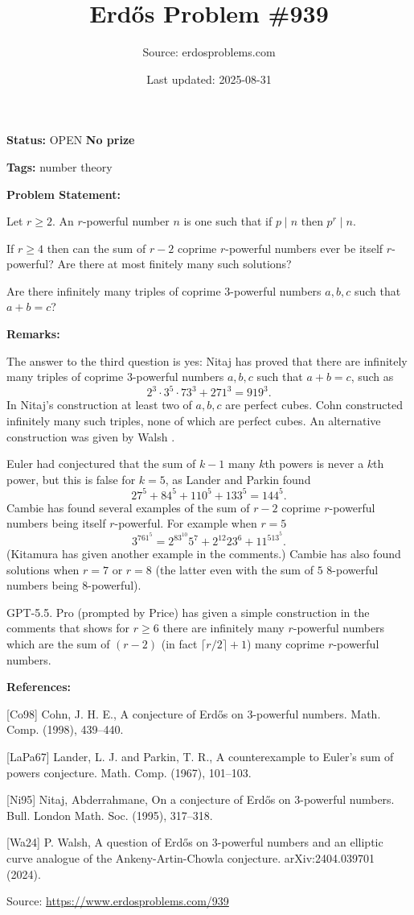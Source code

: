 \documentclass{article}
\title{Erd\H{o}s Problem \#939}
\date{Last updated: 2025-08-31}
\author{Source: erdosproblems.com}
\begin{document}
\maketitle

\noindent\textbf{Status:} OPEN \quad \textbf{No prize}

\noindent\textbf{Tags:} number theory

\medskip
\noindent\textbf{Problem Statement:}

Let $r\geq 2$. An $r$-powerful number $n$ is one such that if $p\mid n$ then $p^r\mid n$.

If $r\geq 4$ then can the sum of $r-2$ coprime $r$-powerful numbers ever be itself $r$-powerful? Are there at most finitely many such solutions?

Are there infinitely many triples of coprime $3$-powerful numbers $a,b,c$ such that $a+b=c$?

\bigskip
\noindent\textbf{Remarks:}

The answer to the third question is yes: Nitaj \cite{Ni95} has proved that there are infinitely many triples of coprime $3$-powerful numbers $a,b,c$ such that $a+b=c$, such as\[2^3\cdot 3^5\cdot 73^3+271^3 = 919^3.\]In Nitaj's construction at least two of $a,b,c$ are perfect cubes. Cohn \cite{Co98} constructed infinitely many such triples, none of which are perfect cubes. An alternative construction was given by Walsh \cite{Wa24}.

Euler had conjectured that the sum of $k-1$ many $k$th powers is never a $k$th power, but this is false for $k=5$, as Lander and Parkin \cite{LaPa67} found\[27^5+84^5+110^5+133^5=144^5.\]Cambie has found several examples of the sum of $r-2$ coprime $r$-powerful numbers being itself $r$-powerful. For example when $r=5$\[3^761^5=2^83^{10}5^7+2^{12}23^6+11^513^5.\](Kitamura has given another example in the comments.) Cambie has also found solutions when $r=7$ or $r=8$ (the latter even with the sum of $5$ $8$-powerful numbers being $8$-powerful).

GPT-5.5. Pro (prompted by Price) has given a simple construction in the comments that shows for $r\geq 6$ there are infinitely many $r$-powerful numbers which are the sum of $(r-2)$ (in fact $\lceil r/2\rceil+1$) many coprime $r$-powerful numbers.

\bigskip
\noindent\textbf{References:}

[Co98] Cohn, J. H. E., A conjecture of {E}rd\H{o}s on {$3$}-powerful numbers. Math. Comp. (1998), 439--440.
 
 [LaPa67] Lander, L. J. and Parkin, T. R., A counterexample to {E}uler's sum of powers conjecture. Math. Comp. (1967), 101--103.
 
 [Ni95] Nitaj, Abderrahmane, On a conjecture of {E}rd\H{o}s on {$3$}-powerful numbers. Bull. London Math. Soc. (1995), 317--318.
 
 [Wa24] P. Walsh, A question of Erd\H{o}s on 3-powerful numbers and an elliptic curve analogue of the Ankeny-Artin-Chowla conjecture. arXiv:2404.039701 (2024).

\bigskip
\noindent\small{Source: \url{https://www.erdosproblems.com/939}}
\end{document}
